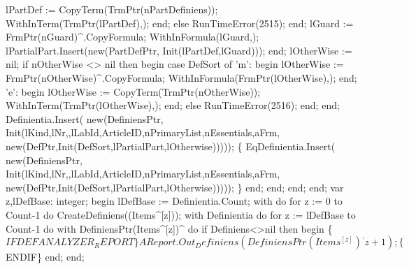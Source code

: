                            lPartDef := CopyTerm(TrmPtr(nPartDefiniens));
                           WithInTerm(TrmPtr(lPartDef),);
                        end;
                  else RunTimeError(2515);
                  end;
                  lGuard := FrmPtr(nGuard)^.CopyFormula;
                  WithInFormula(lGuard,);
                  lPartialPart.Insert(new(PartDefPtr, Init(lPartDef,lGuard)));
               end;
            lOtherWise := nil;
            if nOtherWise <> nil then
            begin
               case DefSort of
                  'm':
                     begin
                        lOtherWise := FrmPtr(nOtherWise)^.CopyFormula;
                        WithInFormula(FrmPtr(lOtherWise),);
                     end;
                  'e':
                     begin
                        lOtherWise := CopyTerm(TrmPtr(nOtherWise));
                        WithInTerm(TrmPtr(lOtherWise),);
                     end;
               else RunTimeError(2516);
               end;
            end;
            Definientia.Insert(
               new(DefiniensPtr,
                   Init(lKind,lNr,,lLabId,ArticleID,nPrimaryList,nEssentials,aFrm,
                        new(DefPtr,Init(DefSort,lPartialPart,lOtherwise)))));
            \{                   
                                EqDefinientia.Insert(
                                new(DefiniensPtr,
                                Init(lKind,lNr,,lLabId,ArticleID,nPrimaryList,nEssentials,aFrm,
                                new(DefPtr,Init(DefSort,lPartialPart,lOtherwise)))));
\}                   
            end;
         end;
      end;
   end;
var
   z,lDefBase: integer;
begin
   lDefBase := Definientia.Count;
   with  do
      for z := 0 to Count-1 do
         CreateDefiniens((Items^[z]));
   with Definientia do
      for z := lDefBase to Count-1 do
         with DefiniensPtr(Items^[z])^ do
            if Definiens<>nil then
            begin
               \{$IFDEF ANALYZER_REPORT\}
               AReport.Out_Definiens(DefiniensPtr(Items^[z])^, z+1);
               \{$ENDIF\}
            end;
end;
\eatline
